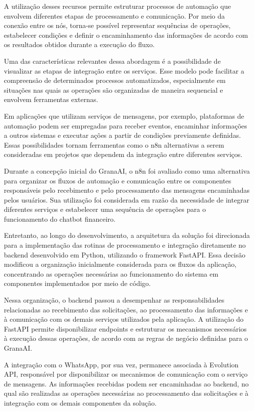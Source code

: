 A utilização desses recursos permite estruturar processos de automação que envolvem diferentes etapas de processamento e comunicação. Por meio da conexão entre os nós, torna-se possível representar sequências de operações, estabelecer condições e definir o encaminhamento das informações de acordo com os resultados obtidos durante a execução do fluxo.

Uma das características relevantes dessa abordagem é a possibilidade de visualizar as etapas de integração entre os serviços. Esse modelo pode facilitar a compreensão de determinados processos automatizados, especialmente em situações nas quais as operações são organizadas de maneira sequencial e envolvem ferramentas externas.

Em aplicações que utilizam serviços de mensagens, por exemplo, plataformas de automação podem ser empregadas para receber eventos, encaminhar informações a outros sistemas e executar ações a partir de condições previamente definidas. Essas possibilidades tornam ferramentas como o n8n alternativas a serem consideradas em projetos que dependem da integração entre diferentes serviços.

Durante a concepção inicial do GranaAI, o n8n foi avaliado como uma alternativa para organizar os fluxos de automação e comunicação entre os componentes responsáveis pelo recebimento e pelo processamento das mensagens encaminhadas pelos usuários. Sua utilização foi considerada em razão da necessidade de integrar diferentes serviços e estabelecer uma sequência de operações para o funcionamento do chatbot financeiro.

Entretanto, ao longo do desenvolvimento, a arquitetura da solução foi direcionada para a implementação das rotinas de processamento e integração diretamente no backend desenvolvido em Python, utilizando o framework FastAPI. Essa decisão modificou a organização inicialmente considerada para os fluxos da aplicação, concentrando as operações necessárias ao funcionamento do sistema em componentes implementados por meio de código.

Nessa organização, o backend passou a desempenhar as responsabilidades relacionadas ao recebimento das solicitações, ao processamento das informações e à comunicação com os demais serviços utilizados pela aplicação. A utilização do FastAPI permite disponibilizar endpoints e estruturar os mecanismos necessários à execução dessas operações, de acordo com as regras de negócio definidas para o GranaAI.

A integração com o WhatsApp, por sua vez, permanece associada à Evolution API, responsável por disponibilizar os mecanismos de comunicação com o serviço de mensagens. As informações recebidas podem ser encaminhadas ao backend, no qual são realizadas as operações necessárias ao processamento das solicitações e à integração com os demais componentes da solução.

